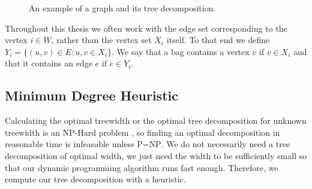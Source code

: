 \documentclass[titlepage, 12pt]{article}
\newcommand{\ccP}[0]{\textsc{P}}
\newcommand{\ccNP}[0]{\textsc{NP}}
\begin{document}
    \begin{figure}
    \centering
    \caption{An example of a graph and its tree decomposition.}
    \label{fig:td}
    \end{figure}

    Throughout this thesis we often work with the edge set corresponding to the vertex $i \in W$, rather
    than the vertex set $X_i$ itself. To that end we define $Y_i = \{(u,v) \in E: u,v \in X_i \}$.
    We say that a bag contains a vertex $v$ if $v \in X_i$ and that it contains an edge $e$ if $e \in Y_i$.


    \subsection{Minimum Degree Heuristic}
    \label{sec:td-heuristic}
    Calculating the optimal treewidth or the optimal tree decomposition for unknown treewidth is an
    \ccNP-Hard problem \cite{tw-hardness}, so finding an optimal decomposition in reasonable time is
    infeasable unless \ccP=\ccNP\@. We do not necessarily need a tree decomposition of optimal
    width, we just need the width to be sufficiently small so that our dynamic programming algorithm
    runs fast enough. Therefore, we compute our tree decomposition with a heuristic.
\end{document}
